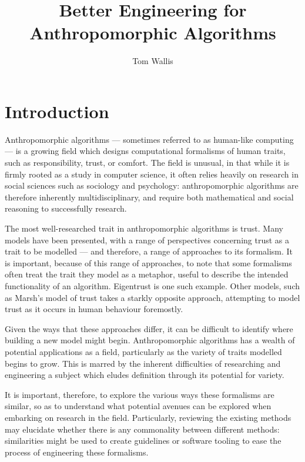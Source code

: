 \documentclass[11pt,english,twocolumn]{article}
\begin{document}
\title{Better Engineering for Anthropomorphic Algorithms}
\author{Tom Wallis}
\date{}
\maketitle

\section{Introduction}
Anthropomorphic algorithms --- sometimes referred to as human-like computing --- is a growing field which designs computational formalisms of human traits, such as responsibility, trust, or comfort. The field is unusual, in that while it is firmly rooted as a study in computer science, it often relies heavily on research in social sciences such as sociology and psychology: anthropomorphic algorithms are therefore inherently multidisciplinary, and require both mathematical and social reasoning to successfully research.\par

The most well-researched trait in anthropomorphic algorithms is trust. Many models have been presented, with a range of perspectives concerning trust as a trait to be modelled --- and therefore, a range of approaches to its formalism. It is important, because of this range of approaches, to note that some formalisms often treat the trait they model as a metaphor, useful to describe the intended functionality of an algorithm. Eigentrust\cite{Kamvar2003} is one such example. Other models, such as Marsh's model of trust\cite{Marsh1994} takes a starkly opposite approach, attempting to model trust as it occurs in human behaviour foremostly.\par

Given the ways that these approaches differ, it can be difficult to identify where building a new model might begin. Anthropomorphic algorithms has a wealth of potential applications as a field, particularly as the variety of traits modelled begins to grow. This is marred by the inherent difficulties of researching and engineering a subject which eludes definition through its potential for variety.\par

It is important, therefore, to explore the various ways these formalisms are similar, so as to understand what potential avenues can be explored when embarking on research in the field. Particularly, reviewing the existing methods may elucidate whether there is any commonality between different methods: similarities might be used to create guidelines or software tooling to ease the process of engineering these formalisms.\par
\end{document}

